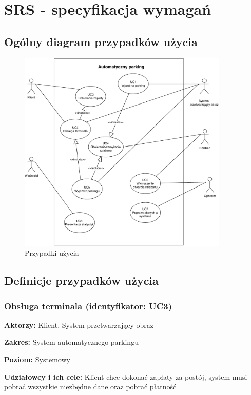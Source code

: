 \chapter{SRS - specyfikacja wymagań}

\section{Ogólny diagram przypadków użycia}

\begin{figure}[H]
	\centering
	\includegraphics[width=100mm]{diagramy/PrzypUzycia.pdf}
	\caption{Przypadki użycia }
\end{figure}

\section{Definicje przypadków użycia}
\subsection{Obsługa terminala (identyfikator: UC3)}
\textbf{Aktorzy: }Klient, System przetwarzający obraz

\hspace{0cm}\textbf{Zakres: }System automatycznego parkingu

\hspace{0cm}\textbf{Poziom: }Systemowy

\hspace{0cm}\textbf{Udziałowcy i ich cele: }Klient chce dokonać zapłaty za postój, system musi pobrać wszystkie niezbędne dane oraz pobrać płatność

